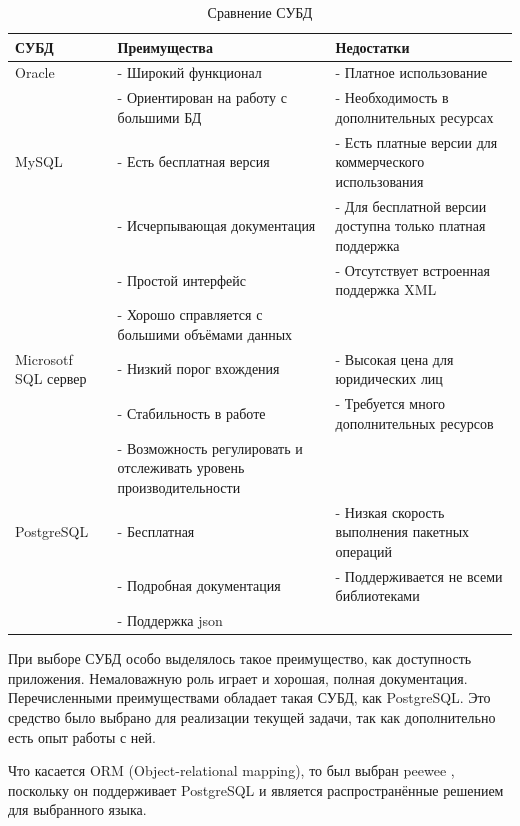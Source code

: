 		\begin{table}[pt!] 
			\begin{center}
				\caption{Сравнение СУБД}
				\label{cmptable}
				\begin{tabular}{| p{4cm} | p{5cm} | p{5cm} |}
					\hline
					\textbf{СУБД} 	& \textbf{Преимущества} & \textbf{Недостатки} \\
					\hline
					Oracle 			& - Широкий функционал & - Платное использование \\ 
									& - Ориентирован на работу с большими БД & - Необходимость в дополнительных ресурсах \\
					\hline
					MySQL 			& - Есть бесплатная версия & - Есть платные версии для коммерческого использования\\
									& - Исчерпывающая документация & - Для бесплатной версии доступна только платная поддержка \\ 
									& - Простой интерфейс & - Отсутствует встроенная поддержка XML \\
									& - Хорошо справляется с большими объёмами данных &  \\
					\hline
					Microsotf SQL сервер  	& - Низкий порог вхождения &- Высокая цена для юридических лиц \\
					 				& - Стабильность в работе & - Требуется много дополнительных ресурсов \\ 
									& - Возможность регулировать и отслеживать уровень производительности &  \\
					\hline
					PostgreSQL 		& - Бесплатная & - Низкая скорость выполнения пакетных операций \\ 
									& - Подробная документация & - Поддерживается не всеми библиотеками \\
									& - Поддержка json &  \\
					\hline
				\end{tabular}
			\end{center}
		\end{table}
	\newpage
	
	При выборе СУБД особо выделялось такое преимущество, как доступность приложения. Немаловажную роль играет и хорошая, полная документация. Перечисленными преимуществами обладает такая СУБД, как PostgreSQL. Это средство было выбрано для реализации текущей задачи, так как дополнительно есть опыт работы с ней.
	
	Что касается ORM (Object-relational mapping), то был выбран peewee \cite{peewee}, поскольку он поддерживает PostgreSQL и является распространённые решением для выбранного языка.
	
